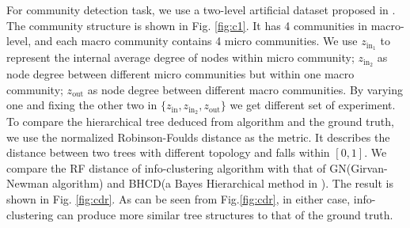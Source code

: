 \documentclass{article}
\begin{document}
For community detection task, we use a two-level artificial dataset proposed in \cite{RN22}. 
The community structure is shown in Fig. \ref{fig:c1}. It has 4 communities in macro-level, and each macro community contains 4 micro communities. We use $z_{\mathrm{in}_1}$ to represent the internal average degree of nodes within micro community; $z_{\mathrm{in}_2}$ as node degree between different micro communities but within one macro community; $z_{\mathrm{out}}$ as node degree between different macro communities. By varying one and fixing the other two in $\{z_{\mathrm{in}} , z_{\mathrm{in}_2}, z_{\mathrm{out}} \}$ we get different set of experiment. To compare the hierarchical tree deduced from algorithm and the ground truth, we use the normalized Robinson-Foulds distance as the metric. It describes the distance between two trees with different topology and falls within $[0,1]$. We compare the RF distance of info-clustering algorithm with that of GN(Girvan-Newman algorithm) and BHCD(a Bayes Hierarchical method in \cite{RN23}). The result is shown in Fig. \ref{fig:cdr}. As can be seen from Fig.\ref{fig:cdr}, in either case, info-clustering can produce more similar tree structures to that of the ground truth.
\end{document}
